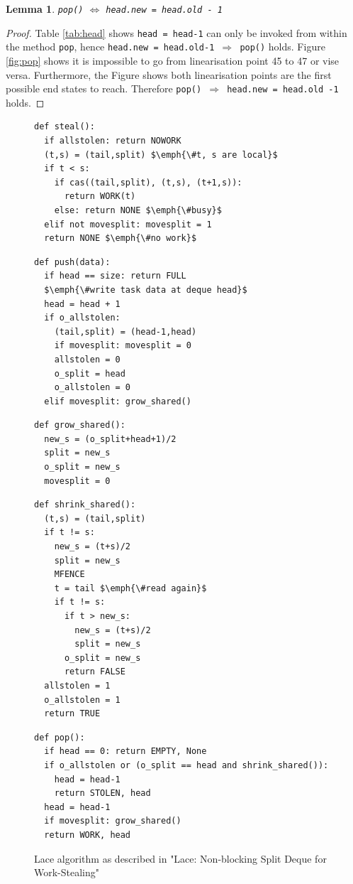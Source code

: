 \documentclass{sig-alternate-br}
\newtheorem{lemma}{Lemma}
\begin{document}
\begin{lemma}
	\texttt{pop()} $\iff$ \texttt{head.new = head.old - 1}
\end{lemma}
\begin{proof}
	Table \ref{tab:head} shows \texttt{head = head-1} can only be invoked from within the method \texttt{pop}, hence \texttt{head.new = head.old-1 $\Rightarrow$ pop()} holds.
	Figure \ref{fig:pop} shows it is impossible to go from linearisation point 45 to 47 or vise versa. Furthermore, the Figure shows both linearisation points are the first possible end states to reach. Therefore \texttt{pop() $\Rightarrow$ head.new = head.old -1} holds.
\end{proof}

\begin{figure}
\begin{lstlisting}
def steal():
  if allstolen: return NOWORK
  (t,s) = (tail,split) $\emph{\#t, s are local}$
  if t < s:
    if cas((tail,split), (t,s), (t+1,s)):
      return WORK(t)
    else: return NONE $\emph{\#busy}$
  elif not movesplit: movesplit = 1
  return NONE $\emph{\#no work}$
\end{lstlisting}
\begin{lstlisting}[firstnumber=10]
def push(data):
  if head == size: return FULL
  $\emph{\#write task data at deque head}$
  head = head + 1
  if o_allstolen:
    (tail,split) = (head-1,head)
    if movesplit: movesplit = 0
    allstolen = 0
    o_split = head
    o_allstolen = 0
  elif movesplit: grow_shared()
\end{lstlisting}
\begin{lstlisting}[firstnumber=21]
def grow_shared():
  new_s = (o_split+head+1)/2
  split = new_s
  o_split = new_s
  movesplit = 0
\end{lstlisting}
\begin{lstlisting}[firstnumber=26]
def shrink_shared():
  (t,s) = (tail,split)
  if t != s:
    new_s = (t+s)/2
    split = new_s
    MFENCE
    t = tail $\emph{\#read again}$
    if t != s:
      if t > new_s:
        new_s = (t+s)/2
        split = new_s
      o_split = new_s
      return FALSE
  allstolen = 1
  o_allstolen = 1
  return TRUE
\end{lstlisting}
\begin{lstlisting}[firstnumber=42]
def pop():
  if head == 0: return EMPTY, None
  if o_allstolen or (o_split == head and shrink_shared()):
    head = head-1
    return STOLEN, head
  head = head-1
  if movesplit: grow_shared()
  return WORK, head
\end{lstlisting}
\caption{Lace algorithm as described in "Lace: Non-blocking Split Deque for Work-Stealing"\cite{vanDijk2014206}}
\label{fig:Lace}
\end{figure}


\end{document}
